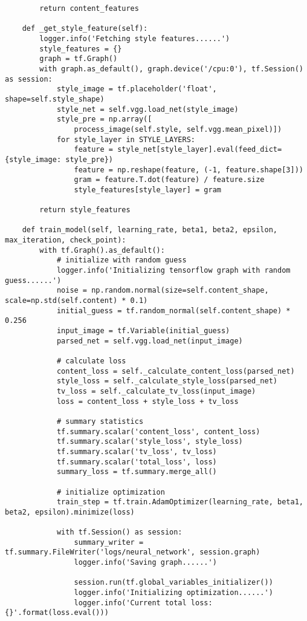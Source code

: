 \begin{spacing}{1}
\begin{lstlisting}
        return content_features

    def _get_style_feature(self):
        logger.info('Fetching style features......')
        style_features = {}
        graph = tf.Graph()
        with graph.as_default(), graph.device('/cpu:0'), tf.Session() as session:
            style_image = tf.placeholder('float', shape=self.style_shape)
            style_net = self.vgg.load_net(style_image)
            style_pre = np.array([
                process_image(self.style, self.vgg.mean_pixel)])
            for style_layer in STYLE_LAYERS:
                feature = style_net[style_layer].eval(feed_dict={style_image: style_pre})
                feature = np.reshape(feature, (-1, feature.shape[3]))
                gram = feature.T.dot(feature) / feature.size
                style_features[style_layer] = gram

        return style_features

    def train_model(self, learning_rate, beta1, beta2, epsilon, max_iteration, check_point):
        with tf.Graph().as_default():
            # initialize with random guess
            logger.info('Initializing tensorflow graph with random guess......')
            noise = np.random.normal(size=self.content_shape, scale=np.std(self.content) * 0.1)
            initial_guess = tf.random_normal(self.content_shape) * 0.256
            input_image = tf.Variable(initial_guess)
            parsed_net = self.vgg.load_net(input_image)

            # calculate loss
            content_loss = self._calculate_content_loss(parsed_net)
            style_loss = self._calculate_style_loss(parsed_net)
            tv_loss = self._calculate_tv_loss(input_image)
            loss = content_loss + style_loss + tv_loss

            # summary statistics
            tf.summary.scalar('content_loss', content_loss)
            tf.summary.scalar('style_loss', style_loss)
            tf.summary.scalar('tv_loss', tv_loss)
            tf.summary.scalar('total_loss', loss)
            summary_loss = tf.summary.merge_all()

            # initialize optimization
            train_step = tf.train.AdamOptimizer(learning_rate, beta1, beta2, epsilon).minimize(loss)

            with tf.Session() as session:
                summary_writer = tf.summary.FileWriter('logs/neural_network', session.graph)
                logger.info('Saving graph......')

                session.run(tf.global_variables_initializer())
                logger.info('Initializing optimization......')
                logger.info('Current total loss: {}'.format(loss.eval()))


\end{lstlisting}
\end{spacing}
